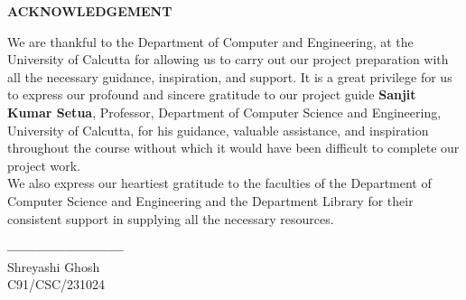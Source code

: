 \begin{center}
    {\large {\bf ACKNOWLEDGEMENT}}
\end{center}

We are thankful to the Department of Computer and Engineering, at the University of Calcutta for allowing us to carry out our project preparation with all the necessary guidance, inspiration, and support. It is a great privilege for us to express our profound and sincere gratitude to our project guide  \textbf{Sanjit Kumar Setua}, Professor, Department of Computer Science and Engineering, University of Calcutta, for his guidance, valuable assistance, and inspiration throughout the course without which it would have been difficult to complete our project work. \\
We also express our heartiest gratitude to the faculties of the Department of Computer Science and Engineering and the Department Library for their consistent support in supplying all the necessary resources. \\

\vspace{10em}

\textbf{------------------------} \\
\hspace*{.4in} Shreyashi Ghosh \\
\hspace*{.35in}  C91/CSC/231024